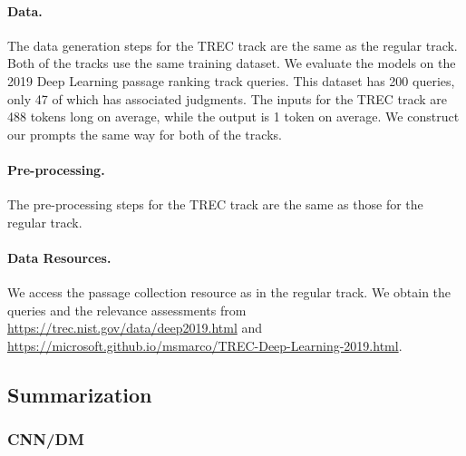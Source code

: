 \paragraph{Data.}
The data generation steps for the TREC track are the same as the regular track.
Both of the tracks use the same training dataset.
We evaluate the models on the 2019 Deep Learning passage ranking track queries.
This dataset has 200 queries, only 47 of which has associated judgments.
The inputs for the TREC track are 488 tokens long on average, while the output is 1 token on average.
We construct our prompts the same way for both of the tracks.

\paragraph{Pre-processing.}
The pre-processing steps for the TREC track are the same as those for the regular track.

\paragraph{Data Resources.}
We access the passage collection resource as in the regular track. We obtain the queries and the relevance assessments from \url{https://trec.nist.gov/data/deep2019.html} and \url{https://microsoft.github.io/msmarco/TREC-Deep-Learning-2019.html}.


\subsection{Summarization}
\label{app:scenarios-summarization}
\subsubsection{CNN/DM}
